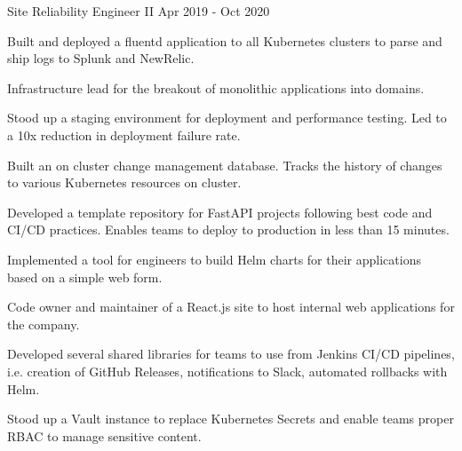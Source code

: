 \begin{cventries}
  \cventry
    {Site Reliability Engineer II} %
    {} %
    {} %
    {Apr 2019 - Oct 2020} %
    {
      \begin{cvitems} %
        \item {Built and deployed a fluentd application to all Kubernetes clusters to parse and ship logs to Splunk and NewRelic.}
        \item {Infrastructure lead for the breakout of monolithic applications into domains.}
        \item {Stood up a staging environment for deployment and performance testing. Led to a 10x reduction in deployment failure rate.}
        \item {Built an on cluster change management database. Tracks the history of changes to various Kubernetes resources on cluster.}
        \item {Developed a template repository for FastAPI projects following best code and CI/CD practices. Enables teams to deploy to production in less than 15 minutes.}
        \item {Implemented a tool for engineers to build Helm charts for their applications based on a simple web form.}
        \item {Code owner and maintainer of a React.js site to host internal web applications for the company.}
        \item {Developed several shared libraries for teams to use from Jenkins CI/CD pipelines, i.e. creation of GitHub Releases, notifications to Slack, automated rollbacks with Helm.}
        \item {Stood up a Vault instance to replace Kubernetes Secrets and enable teams proper RBAC to manage sensitive content.}
      \end{cvitems}
    }



\end{cventries}
